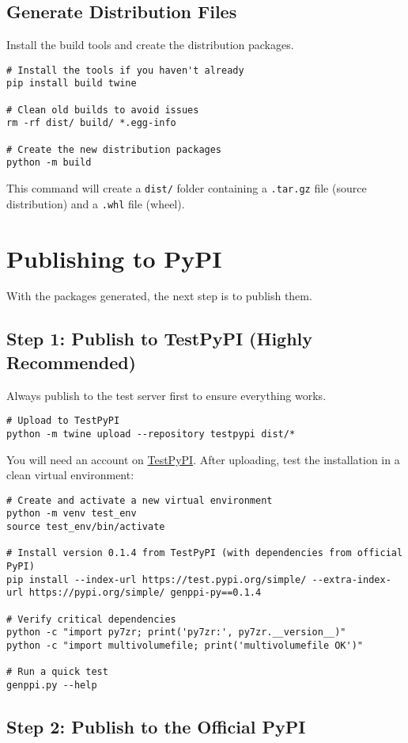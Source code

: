 \documentclass[11pt, a4paper]{article}
\begin{document}
\subsection{Generate Distribution Files}
Install the build tools and create the distribution packages.
\begin{lstlisting}[style=bashstyle]
# Install the tools if you haven't already
pip install build twine

# Clean old builds to avoid issues
rm -rf dist/ build/ *.egg-info

# Create the new distribution packages
python -m build
\end{lstlisting}
This command will create a \texttt{dist/} folder containing a \texttt{.tar.gz} file (source distribution) and a \texttt{.whl} file (wheel).

\section{Publishing to PyPI}
With the packages generated, the next step is to publish them.

\subsection{Step 1: Publish to TestPyPI (Highly Recommended)}
Always publish to the test server first to ensure everything works.
\begin{lstlisting}[style=bashstyle]
# Upload to TestPyPI
python -m twine upload --repository testpypi dist/*
\end{lstlisting}
You will need an account on \href{https://test.pypi.org/}{TestPyPI}. After uploading, test the installation in a clean virtual environment:
\begin{lstlisting}[style=bashstyle]
# Create and activate a new virtual environment
python -m venv test_env
source test_env/bin/activate

# Install version 0.1.4 from TestPyPI (with dependencies from official PyPI)
pip install --index-url https://test.pypi.org/simple/ --extra-index-url https://pypi.org/simple/ genppi-py==0.1.4

# Verify critical dependencies
python -c "import py7zr; print('py7zr:', py7zr.__version__)"
python -c "import multivolumefile; print('multivolumefile OK')"

# Run a quick test
genppi.py --help
\end{lstlisting}

\subsection{Step 2: Publish to the Official PyPI}
\end{document}
